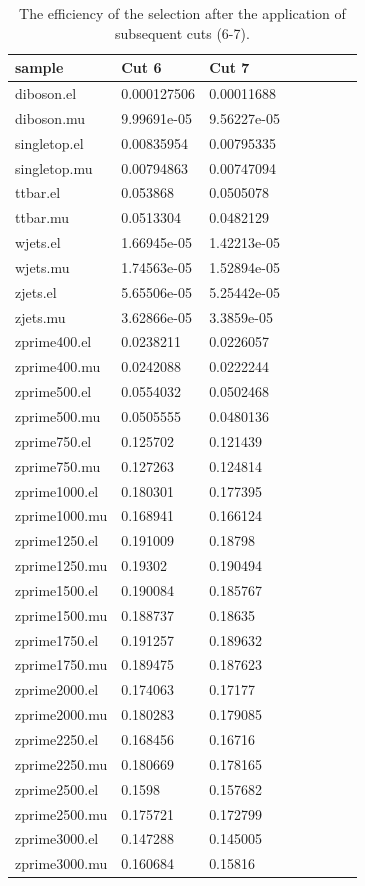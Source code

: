 \begin{table}[]
  \begin{tabular}{l|lllllll}
      sample           & Cut 6  & Cut 7 \\
      \hline
      diboson.el    & 0.000127506 & 0.00011688  \\
      diboson.mu    & 9.99691e-05 & 9.56227e-05 \\
      singletop.el  & 0.00835954  & 0.00795335  \\
      singletop.mu  & 0.00794863  & 0.00747094  \\
      ttbar.el      & 0.053868    & 0.0505078   \\
      ttbar.mu      & 0.0513304   & 0.0482129   \\
      wjets.el      & 1.66945e-05 & 1.42213e-05 \\
      wjets.mu      & 1.74563e-05 & 1.52894e-05 \\
      zjets.el      & 5.65506e-05 & 5.25442e-05 \\
      zjets.mu      & 3.62866e-05 & 3.3859e-05  \\
      zprime400.el  & 0.0238211   & 0.0226057   \\
      zprime400.mu  & 0.0242088   & 0.0222244   \\
      zprime500.el  & 0.0554032   & 0.0502468   \\
      zprime500.mu  & 0.0505555   & 0.0480136   \\
      zprime750.el  & 0.125702    & 0.121439    \\
      zprime750.mu  & 0.127263    & 0.124814    \\
      zprime1000.el & 0.180301    & 0.177395    \\
      zprime1000.mu & 0.168941    & 0.166124    \\
      zprime1250.el & 0.191009    & 0.18798     \\
      zprime1250.mu & 0.19302     & 0.190494    \\
      zprime1500.el & 0.190084    & 0.185767    \\
      zprime1500.mu & 0.188737    & 0.18635     \\
      zprime1750.el & 0.191257    & 0.189632    \\
      zprime1750.mu & 0.189475    & 0.187623    \\
      zprime2000.el & 0.174063    & 0.17177     \\
      zprime2000.mu & 0.180283    & 0.179085    \\
      zprime2250.el & 0.168456    & 0.16716     \\
      zprime2250.mu & 0.180669    & 0.178165    \\
      zprime2500.el & 0.1598      & 0.157682    \\
      zprime2500.mu & 0.175721    & 0.172799    \\
      zprime3000.el & 0.147288    & 0.145005    \\
      zprime3000.mu & 0.160684    & 0.15816     
      \end{tabular}
\caption{The efficiency of the selection after the application of subsequent cuts (6-7).}
\label{tab:eff_b}

  \end{table}